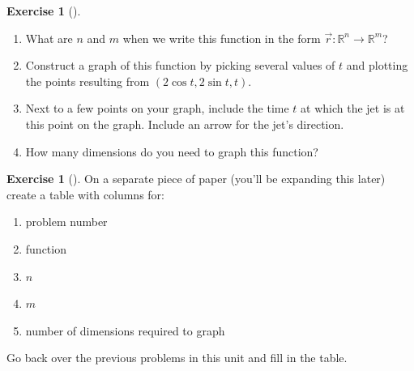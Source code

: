 \documentclass[10pt,]{book}
\theoremstyle{plain}
\theoremstyle{definition}
\theoremstyle{definition}
\theoremstyle{definition}
\theoremstyle{definition}
\newtheorem{exploration}[project]{Exercise}
\theoremstyle{definition}
\numberwithin{equation}{section}
\begin{document}
\begin{exploration}[]\label{prob_jet_intro_for_space_curves}
\leavevmode%
\begin{enumerate}[font=\bfseries,label=(\alph*),ref=\alph*]
\item\label{task-174} What are \(n\) and \(m\) when we write this function in the form  \(\vec r\colon {\mathbb{R}}^n\to {\mathbb{R}}^m\)?%
\item\label{task-175} Construct a graph of this function by picking several values of \(t\) and plotting the points resulting from \((2\cos t, 2\sin t, t)\).%
\item\label{task-176} Next to a few points on your graph, include the time \(t\) at which the jet is at this point on the graph. Include an arrow for the jet's direction.%
\item\label{task-177} How many dimensions do you need to graph this function?%
\end{enumerate}
\end{exploration}
\begin{exploration}[]\label{prob_function_table}
On a separate piece of paper (you'll be expanding this later) create a table with columns for: \leavevmode%
\begin{itemize}[label=\textbullet]
\begin{enumerate}[font=\bfseries,label=(\alph*),ref=\alph*]
\item\label{task-178} problem number%
\item\label{task-179} function%
\item\label{task-180} \(n\)%
\item\label{task-181} \(m\)%
\item\label{task-182} number of dimensions required to graph%
\end{enumerate}
\end{itemize}
%
\par
Go back over the previous problems in this unit and fill in the table.%
\end{exploration}
\typeout{************************************************}
\typeout{************************************************}
\end{document}
